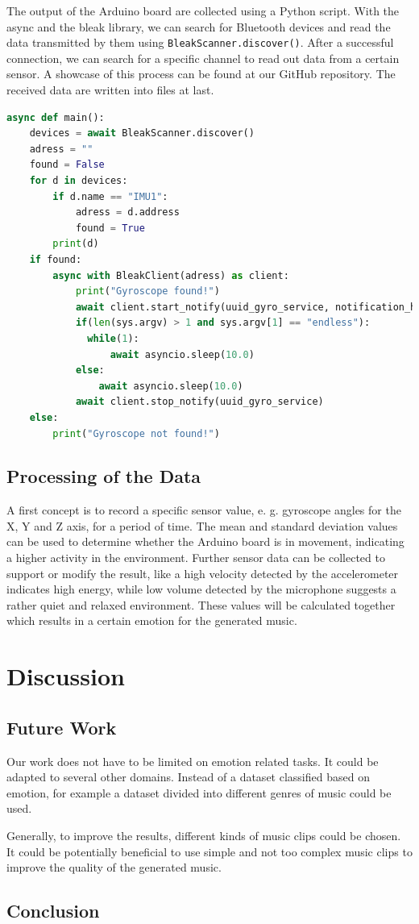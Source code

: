 \documentclass{article}
\begin{document}
The output of the Arduino board are collected using a Python script. With the async and the bleak library, we can search for Bluetooth devices and read the data transmitted by them using \texttt{BleakScanner.discover()}. After a successful connection, we can search for a specific channel to read out data from a certain sensor. A showcase of this process can be found at our GitHub repository. \cite{getGyro} The received data are written into files at last.
\begin{lstlisting}[language=Python, frame=single, breaklines=true]
async def main():
    devices = await BleakScanner.discover()
    adress = ""
    found = False
    for d in devices:
        if d.name == "IMU1":
            adress = d.address
            found = True
        print(d)
    if found:
        async with BleakClient(adress) as client:
            print("Gyroscope found!")
            await client.start_notify(uuid_gyro_service, notification_handler)
            if(len(sys.argv) > 1 and sys.argv[1] == "endless"):
              while(1):
                  await asyncio.sleep(10.0)
            else:
                await asyncio.sleep(10.0)
            await client.stop_notify(uuid_gyro_service)
    else:
        print("Gyroscope not found!")    
\end{lstlisting}

\subsection{Processing of the Data}
A first concept is to record a specific sensor value, e. g. gyroscope angles for the X, Y and Z axis, for a period of time. The mean and standard deviation values can be used to determine whether the Arduino board is in movement, indicating a higher activity in the environment. Further sensor data can be collected to support or modify the result, like a high velocity detected by the accelerometer indicates high energy, while low volume detected by the microphone suggests a rather quiet and relaxed environment. These values will be calculated together which results in a certain emotion for the generated music.


\section{Discussion}

\subsection{Future Work}
Our work does not have to be limited on emotion related tasks. It could be adapted to several other domains. Instead of a dataset classified based on emotion, for example a dataset divided into different genres of music could be used.

Generally, to improve the results, different kinds of music clips could be chosen. It could be potentially beneficial to use simple and not too complex music clips to improve the quality of the generated music.

\subsection{Conclusion}



 
\end{document}
